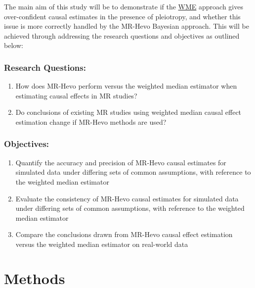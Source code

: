 \documentclass[
]{article}
\providecommand{\tightlist}{%
  \setlength{\itemsep}{0pt}\setlength{\parskip}{0pt}}
\begin{document}
The main aim of this study will be to demonstrate if the \hyperref[acronyms_WME]{WME} approach gives over-confident causal estimates in the presence of pleiotropy, and whether this issue is more correctly handled by the MR-Hevo Bayesian approach. This will be achieved through addressing the research questions and objectives as outlined below:

\subsubsection*{Research Questions:}\label{research-questions}

\begin{enumerate}
\def\labelenumi{\arabic{enumi}.}
\tightlist
\item
  How does MR-Hevo perform versus the weighted median estimator when estimating causal effects in MR studies?
\item
  Do conclusions of existing MR studies using weighted median causal effect estimation change if MR-Hevo methods are used?
\end{enumerate}

\subsubsection*{Objectives:}\label{objectives}

\begin{enumerate}
\def\labelenumi{\arabic{enumi}.}
\tightlist
\item
  Quantify the accuracy and precision of MR-Hevo causal estimates for simulated data under differing sets of common assumptions, with reference to the weighted median estimator
\item
  Evaluate the consistency of MR-Hevo causal estimates for simulated data under differing sets of common assumptions, with reference to the weighted median estimator
\item
  Compare the conclusions drawn from MR-Hevo causal effect estimation versus the weighted median estimator on real-world data
\end{enumerate}

\newpage

\section{Methods}\label{Methods}
\end{document}
